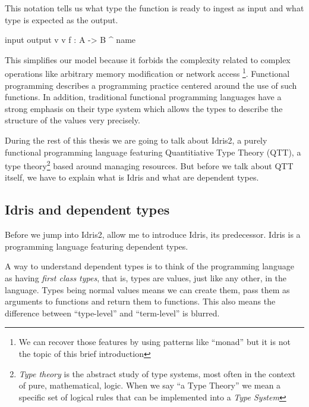 \documentclass[
]{article}
\newenvironment{Shaded}{}{}
\newcommand{\DataTypeTok}[1]{\textcolor[rgb]{0.56,0.13,0.00}{#1}}
\newcommand{\NormalTok}[1]{#1}
\newcommand{\OperatorTok}[1]{\textcolor[rgb]{0.40,0.40,0.40}{#1}}
\newcommand{\OtherTok}[1]{\textcolor[rgb]{0.00,0.44,0.13}{#1}}
\begin{document}
This notation tells us what type the function is ready to ingest as
input and what type is expected as the output.

\begin{Shaded}
\begin{Highlighting}[]
\NormalTok{input    output}
\NormalTok{    v    v}
\NormalTok{f }\OperatorTok{:} \DataTypeTok{A} \OtherTok{{-}\textgreater{}} \DataTypeTok{B}
\OperatorTok{\^{}}
\NormalTok{name }
\end{Highlighting}
\end{Shaded}

This simplifies our model because it forbids the complexity related to
complex operations like arbitrary memory modification or network access
\footnote{We can recover those features by using patterns like ``monad''
  but it is not the topic of this brief introduction}. Functional
programming describes a programming practice centered around the use of
such functions. In addition, traditional functional programming
languages have a strong emphasis on their type system which allows the
types to describe the structure of the values very precisely.

During the rest of this thesis we are going to talk about Idris2, a
purely functional programming language featuring Quantitiative Type
Theory (QTT), a type theory\footnote{\emph{Type theory} is the abstract
  study of type systems, most often in the context of pure,
  mathematical, logic. When we say ``a Type Theory'' we mean a specific
  set of logical rules that can be implemented into a \emph{Type System}}
based around managing resources. But before we talk about QTT itself, we
have to explain what is Idris and what are dependent types.

\hypertarget{idris-and-dependent-types}{%
\subsection{Idris and dependent types}\label{idris-and-dependent-types}}

Before we jump into Idris2, allow me to introduce Idris, its
predecessor. Idris is a programming language featuring dependent types.

A way to understand dependent types is to think of the programming
language as having \emph{first class types}, that is, types are values,
just like any other, in the language. Types being normal values means we
can create them, pass them as arguments to functions and return them to
functions. This also means the difference between ``type-level'' and
``term-level'' is blurred.
\end{document}
